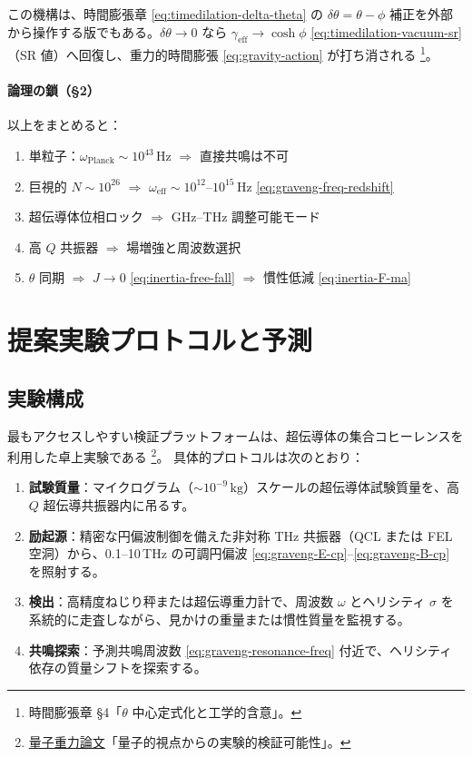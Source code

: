 \documentclass[dvipdfmx,a4paper,oneside]{jsbook}
\numberwithin{equation}{chapter}
\begin{document}
この機構は、時間膨張章 \eqref{eq:timedilation-delta-theta} の \(\delta\theta = \theta - \phi\) 補正を外部から操作する版でもある。\(\delta\theta \to 0\) なら \(\gamma_{\mathrm{eff}} \to \cosh\phi\) \eqref{eq:timedilation-vacuum-sr}（SR 値）へ回復し、重力的時間膨張 \eqref{eq:gravity-action} が打ち消される \footnote{時間膨張章 §4「\(\theta\) 中心定式化と工学的含意」。}。

\paragraph{論理の鎖（§2）}
以上をまとめると：
\begin{enumerate}[leftmargin=2em]
  \item 単粒子：\(\omega_{\mathrm{Planck}} \sim 10^{43}\,\mathrm{Hz}\) \(\Rightarrow\) 直接共鳴は不可
  \item 巨視的 \(N \sim 10^{26}\) \(\Rightarrow\) \(\omega_{\mathrm{eff}} \sim 10^{12}\)–\(10^{15}\,\mathrm{Hz}\) \eqref{eq:graveng-freq-redshift}
  \item 超伝導体位相ロック \(\Rightarrow\) GHz--THz 調整可能モード
  \item 高 \(Q\) 共振器 \(\Rightarrow\) 場増強と周波数選択
  \item \(\theta\) 同期 \(\Rightarrow\) \(J \to 0\) \eqref{eq:inertia-free-fall} \(\Rightarrow\) 慣性低減 \eqref{eq:inertia-F-ma}
\end{enumerate}

\section{提案実験プロトコルと予測}

\subsection{実験構成}

最もアクセスしやすい検証プラットフォームは、超伝導体の集合コヒーレンスを利用した卓上実験である \footnote{\hyperref[sec:sister-manuscripts]{量子重力論文}「量子的視点からの実験的検証可能性」。}。
具体的プロトコルは次のとおり：

\begin{enumerate}[leftmargin=2em]
  \item \textbf{試験質量}：マイクログラム（\(\sim 10^{-9}\,\mathrm{kg}\)）スケールの超伝導体試験質量を、高 \(Q\) 超伝導共振器内に吊るす。
  \item \textbf{励起源}：精密な円偏波制御を備えた非対称 THz 共振器（QCL または FEL 空洞）から、0.1--10\,THz の可調円偏波 \eqref{eq:graveng-E-cp}–\eqref{eq:graveng-B-cp} を照射する。
  \item \textbf{検出}：高精度ねじり秤または超伝導重力計で、周波数 \(\omega\) とヘリシティ \(\sigma\) を系統的に走査しながら、見かけの重量または慣性質量を監視する。
  \item \textbf{共鳴探索}：予測共鳴周波数 \eqref{eq:graveng-resonance-freq} 付近で、ヘリシティ依存の質量シフトを探索する。
\end{enumerate}
\end{document}
